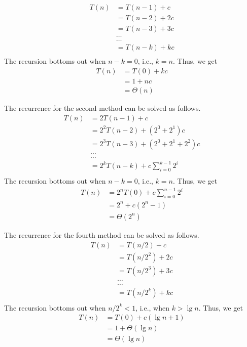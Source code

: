 \documentclass[11pt,twoside]{article}
\begin{document}
\begin{align*}
T(n) & =  T(n-1) + c \\
& =  T(n-2) + 2c \\
& =  T(n-3) + 3c\\
&  \ldots \\
&  \ldots \\
& =  T(n-k) + kc \\
\end{align*}
\noindent
The recursion bottoms out when $n-k=0$, i.e., $k=n$. Thus, we get
\begin{align*}
T(n) & =  T(0) + kc\\
     & =  1 + nc \\
     & =  \Theta(n)
\end{align*}

The recurrence for the second method can be solved as follows.
\begin{align*}
T(n) & =  2T(n-1) + c \\
& =  2^2T(n-2) + (2^0 + 2^1)c \\
& =  2^3T(n-3) + (2^0 + 2^1 + 2^2)c\\
&  \ldots \\
&  \ldots \\
& =  2^kT(n-k) + c\sum_{i=0}^{k-1}2^i \\
\end{align*}
\noindent
The recursion bottoms out when $n-k=0$, i.e., $k=n$. Thus, we get
\begin{align*}
T(n) & =  2^{n}T(0) + c\sum_{i=0}^{n-1}2^i \\ 
     & =  2^{n} + c(2^{n} -1) \\
     & =  \Theta(2^n)
\end{align*}

The recurrence for the fourth method can be solved as follows.
\begin{align*}
T(n) & =  T(n/2) + c \\
& =  T(n/2^2) + 2c \\
& =  T(n/2^3) + 3c \\
&  \ldots \\
&  \ldots \\
& =  T(n/2^k) + kc \\
\end{align*}
\noindent
The recursion bottoms out when $n/2^k < 1$, i.e., when $k> \lg n$. Thus, we get
\begin{align*}
T(n) & =  T(0) + c(\lg n + 1)\\
     & =  1  + \Theta(\lg n)\\
     & =  \Theta(\lg n)
\end{align*}
\end{document}
